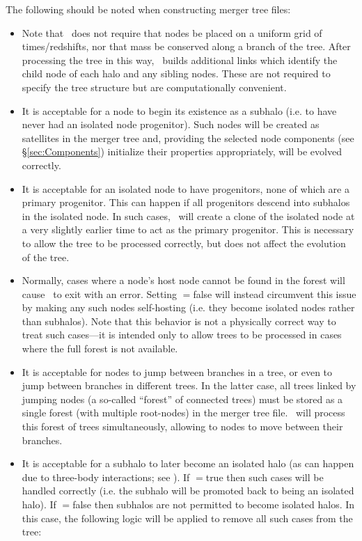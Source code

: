 The following should be noted when constructing merger tree files:
\begin{itemize}
\item Note that \glc\ does not require that nodes be placed on a uniform grid of times/redshifts, nor that mass be conserved along a branch of the tree. After processing the tree in this way, \glc\ builds additional links which identify the child node of each halo and any sibling nodes. These are not required to specify the tree structure but are computationally convenient.
\item It is acceptable for a node to begin its existence as a subhalo (i.e. to have never had an isolated node progenitor). Such nodes will be created as satellites in the merger tree and, providing the selected node components (see \S\ref{sec:Components}) initialize their properties appropriately, will be evolved correctly.
\item It is acceptable for an isolated node to have progenitors, none of which are a primary progenitor. This can happen if all progenitors descend into subhalos in the isolated node. In such cases, \glc\ will create a clone of the isolated node at a very slightly earlier time to act as the primary progenitor. This is necessary to allow the tree to be processed correctly, but does not affect the evolution of the tree.
\item Normally, cases where a node's host node cannot be found in the \gls{forest} will cause \glc\ to exit with an error. Setting {\normalfont \ttfamily [mergerTreeReadMissingHostsAreFatal]}$=${\normalfont \ttfamily false} will instead circumvent this issue by making any such nodes self-hosting (i.e. they become isolated nodes rather than subhalos). Note that this behavior is not a physically correct way to treat such cases---it is intended only to allow trees to be processed in cases where the full \gls{forest} is not available.
\item It is acceptable for nodes to jump between branches in a tree, or even to jump between branches in different trees. In the latter case, all trees linked by jumping nodes (a so-called ``\gls{forest}'' of connected trees) must be stored as a single forest (with multiple root-nodes) in the merger tree file. \glc\ will process this \gls{forest} of trees simultaneously, allowing to nodes to move between their branches.
\item It is acceptable for a subhalo to later become an isolated halo (as can happen due to three-body interactions; see  \citealt{sales_cosmic_2007}). If {\normalfont \ttfamily [mergerTreeReadAllowSubhaloPromotions]}$=${\normalfont \ttfamily true} then such cases will be handled correctly (i.e. the subhalo will be promoted back to being an isolated halo). If {\normalfont \ttfamily [mergerTreeReadAllowSubhaloPromotions]}$=${\normalfont \ttfamily false} then subhalos are not permitted to become isolated halos. In this case, the following logic will be applied to remove all such cases from the tree:\\


\end{itemize}
